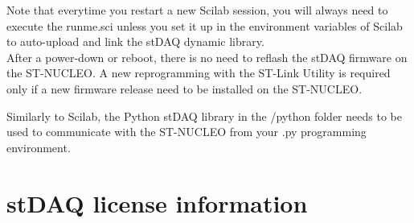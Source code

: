 \documentclass[letterpaper,10pt,english]{hitec}
\begin{document}
Note that everytime you restart a new Scilab session, you will always need to execute the runme.sci unless you set it up in the environment variables of Scilab to auto-upload and link the stDAQ dynamic library. \\
After a power-down or reboot, there is no need to reflash the stDAQ firmware on the ST-NUCLEO. 
A new reprogramming with the ST-Link Utility is required only if a new firmware release need to be installed on the ST-NUCLEO.

Similarly to Scilab, the Python stDAQ library in the /python folder needs to be used to communicate with the ST-NUCLEO from your .py programming environment.








\newpage

\section{stDAQ license information}
\end{document}
